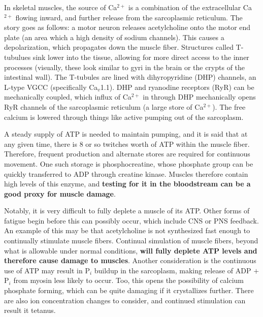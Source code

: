 \documentclass[12pt]{report}
\begin{document}
In skeletal muscles, the source of Ca$^{2+}$ is a combination of the extracellular Ca$^{2+}$ flowing inward, and further release from the sarcoplasmic reticulum. The story goes as follows: a motor neuron releases acetylcholine onto the motor end plate (an area which a high density of sodium channels). This causes a depolarization, which propagates down the muscle fiber. Structures called T-tubulues sink lower into the tissue, allowing for more direct access to the inner processes (visually, these look similar to gyri in the brain or the crypts of the intestinal wall). The T-tubules are lined with dihyropyridine (DHP) channels, an L-type VGCC (specifically Ca$_v$1.1). DHP and ryanodine receptors (RyR) can be mechanically coupled, which influx of Ca$^{2+}$ in through DHP mechanically opens RyR channels of the sarcoplasmic reticulum (a large store of Ca$^{2+}$). The free calcium is lowered through things like active pumping out of the sarcoplasm.\newline

A steady supply of ATP is needed to maintain pumping, and it is said that at any given time, there is 8 or so twitches worth of ATP within the muscle fiber. Therefore, frequent production and alternate stores are required for continuous movement. One such storage is phosphocreatine, whose phosphate group can be quickly transferred to ADP through creatine kinase. Muscles therefore contain high levels of this enzyme, and \textbf{testing for it in the bloodstream can be a good proxy for muscle damage}.\newline

Notably, it is very difficult to fully deplete a muscle of its ATP. Other forms of fatigue begin before this can possibly occur, which include CNS or PNS feedback. An example of this may be that acetylcholine is not synthesized fast enough to continually stimulate muscle fibers. Continual simulation of muscle fibers, beyond what is allowable under normal conditions, \textbf{will fully deplete ATP levels and therefore cause damage to muscles}. Another consideration is the continuous use of ATP may result in P$_i$ buildup in the sarcoplasm, making release of ADP $+$ P$_i$ from myosin less likely to occur. Too, this opens the possibility of calcium phosphate forming, which can be quite damaging if it crystallizes further. There are also ion concentration changes to consider, and continued stimulation can result it tetanus.
\end{document}

